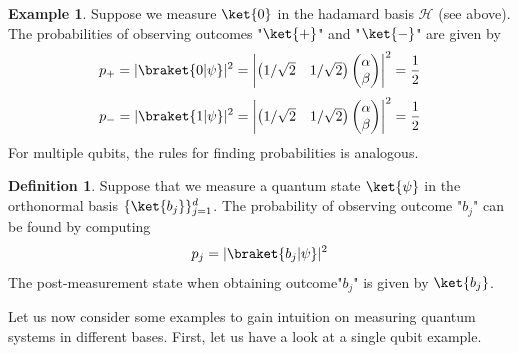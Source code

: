 \documentclass[12pt, oneside]{book}
\theoremstyle{definition}
\newtheorem{definition}{Definition}[section]
\theoremstyle{definition}
\newtheorem{example}{Example}[section]
\theoremstyle{remark}
\begin{document}
\begin{example}
    Suppose we measure $\ket{0}$ in the hadamard basis $\mathcal{H}$ (see above). The probabilities of observing outcomes "$\ket{+}$" and "$\ket{-}$" are given by
    \[
    p_+=|\braket{0|\psi}|^2=\begin{vmatrix}\begin{pmatrix} 1/\sqrt{2} & 1/\sqrt{2} \end{pmatrix} \begin{pmatrix}\alpha \\ \beta \end{pmatrix}  \end{vmatrix}^2=\frac{1}{2}
\]
\[
p_-=|\braket{1|\psi}|^2=\begin{vmatrix} \begin{pmatrix} 1/\sqrt{2} & 1/\sqrt{2} \end{pmatrix}\begin{pmatrix}\alpha \\ \beta \end{pmatrix}  \end{vmatrix}^2=\frac{1}{2}
\]
For multiple qubits, the rules for finding probabilities is analogous.
\end{example}

\begin{definition}
    Suppose that we measure a quantum state $\ket{\psi}$ in the orthonormal basis $\{\ket{b_j}\}_{j=1}^d$. The probability of observing outcome "$b_j$" can be found by computing
    \[
    p_j=|\braket{b_j|\psi}|^2
    \]
    The post-measurement state when obtaining outcome"$b_j$" is given by $\ket{b_j}$.
\end{definition}

Let us now consider some examples to gain intuition on measuring quantum systems in different
bases. First, let us have a look at a single qubit example.
\end{document}

